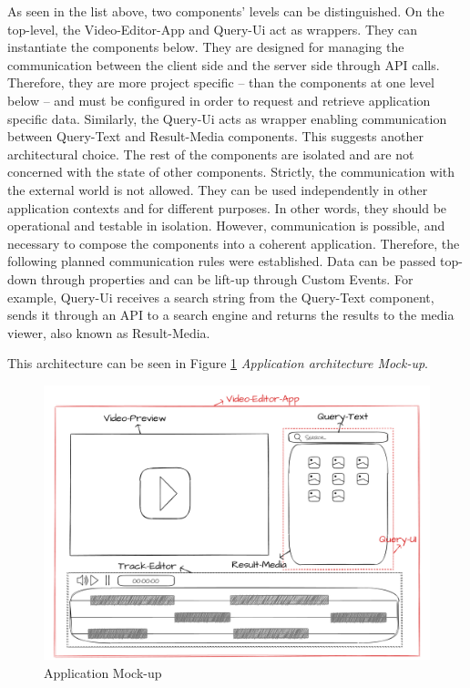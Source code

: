 As seen in the list above, two components’ levels can be distinguished. On the top-level, the Video-Editor-App and Query-Ui act as wrappers. They can instantiate the components below. They are designed for managing the communication between the client side and the server side through API calls. Therefore, they are more project specific – than the components at one level below – and must be configured in order to request and retrieve application specific data. Similarly, the Query-Ui acts as wrapper enabling communication between Query-Text and Result-Media components.
This suggests another architectural choice. The rest of the components are isolated and are not concerned with the state of other components. Strictly, the communication with the external world is not allowed. They can be used independently in other application contexts and for different purposes. In other words, they should be operational and testable in isolation.
However, communication is possible, and necessary to compose the components into a coherent application. Therefore, the following planned communication rules were established. Data can be passed top-down through properties and can be lift-up through Custom Events. For example, Query-Ui receives a search string from the Query-Text component, sends it through an API to a search engine and returns the results to the media viewer, also known as Result-Media.

This architecture can be seen in Figure \ref{fig:appMockUp} \emph{Application architecture Mock-up}.

\begin{figure}[H]
\centering
\includegraphics[width=1\textwidth]{images/Wireframe.png}
\caption{Application Mock-up}
\label{fig:appMockUp}
\end{figure}

